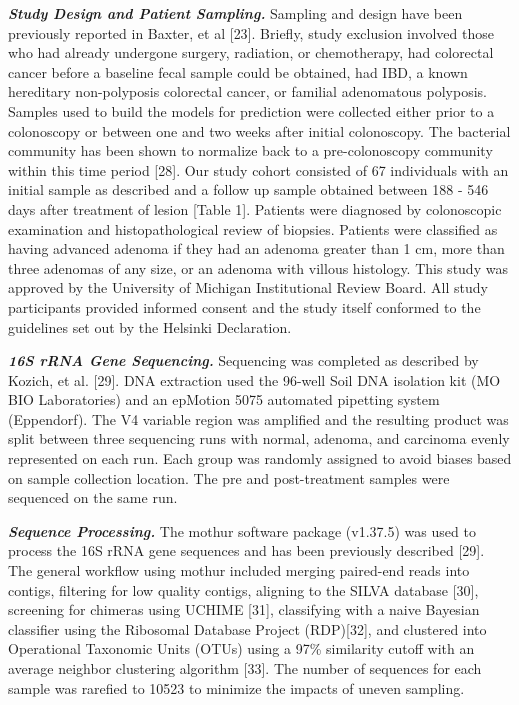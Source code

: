 \documentclass[12pt,]{article}
\begin{document}
\textbf{\emph{Study Design and Patient Sampling.}} Sampling and design
have been previously reported in Baxter, et al {[}23{]}. Briefly, study
exclusion involved those who had already undergone surgery, radiation,
or chemotherapy, had colorectal cancer before a baseline fecal sample
could be obtained, had IBD, a known hereditary non-polyposis colorectal
cancer, or familial adenomatous polyposis. Samples used to build the
models for prediction were collected either prior to a colonoscopy or
between one and two weeks after initial colonoscopy. The bacterial
community has been shown to normalize back to a pre-colonoscopy
community within this time period {[}28{]}. Our study cohort consisted
of 67 individuals with an initial sample as described and a follow up
sample obtained between 188 - 546 days after treatment of lesion
{[}Table 1{]}. Patients were diagnosed by colonoscopic examination and
histopathological review of biopsies. Patients were classified as having
advanced adenoma if they had an adenoma greater than 1 cm, more than
three adenomas of any size, or an adenoma with villous histology. This
study was approved by the University of Michigan Institutional Review
Board. All study participants provided informed consent and the study
itself conformed to the guidelines set out by the Helsinki Declaration.

\textbf{\emph{16S rRNA Gene Sequencing.}} Sequencing was completed as
described by Kozich, et al. {[}29{]}. DNA extraction used the 96-well
Soil DNA isolation kit (MO BIO Laboratories) and an epMotion 5075
automated pipetting system (Eppendorf). The V4 variable region was
amplified and the resulting product was split between three sequencing
runs with normal, adenoma, and carcinoma evenly represented on each run.
Each group was randomly assigned to avoid biases based on sample
collection location. The pre and post-treatment samples were sequenced
on the same run.

\textbf{\emph{Sequence Processing.}} The mothur software package
(v1.37.5) was used to process the 16S rRNA gene sequences and has been
previously described {[}29{]}. The general workflow using mothur
included merging paired-end reads into contigs, filtering for low
quality contigs, aligning to the SILVA database {[}30{]}, screening for
chimeras using UCHIME {[}31{]}, classifying with a naive Bayesian
classifier using the Ribosomal Database Project (RDP){[}32{]}, and
clustered into Operational Taxonomic Units (OTUs) using a 97\%
similarity cutoff with an average neighbor clustering algorithm
{[}33{]}. The number of sequences for each sample was rarefied to 10523
to minimize the impacts of uneven sampling.
\end{document}
